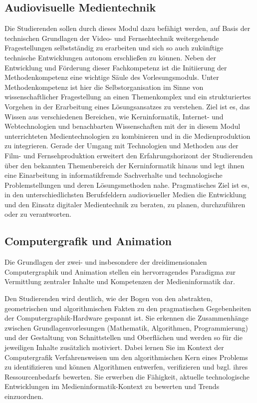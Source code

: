 \subsection{Audiovisuelle
Medientechnik}\label{audiovisuelle-medientechnik}

Die Studierenden sollen durch dieses Modul dazu befähigt werden, auf
Basis der technischen Grundlagen der Video- und Fernsehtechnik
weitergehende Fragestellungen selbstständig zu erarbeiten und sich so
auch zukünftige technische Entwicklungen autonom erschließen zu können.
Neben der Entwicklung und Förderung dieser Fachkompetenz ist die
Initiierung der Methodenkompetenz eine wichtige Säule des
Vorlesungsmoduls. Unter Methodenkompetenz ist hier die
Selbstorganisation im Sinne von wissenschaftlicher Fragestellung an
einen Themenkomplex und ein strukturiertes Vorgehen in der Erarbeitung
eines Lösungsansatzes zu verstehen. Ziel ist es, das Wissen aus
verschiedenen Bereichen, wie Kerninformatik, Internet- und
Webtechnologien und benachbarten Wissenschaften mit der in diesem Modul
unterrichteten Medientechnologien zu kombinieren und in die
Medienproduktion zu integrieren. Gerade der Umgang mit Technologien und
Methoden aus der Film- und Fernsehproduktion erweitert den
Erfahrungshorizont der Studierenden über den bekannten Themenbereich der
Kerninformatik hinaus und legt ihnen eine Einarbeitung in
informatikfremde Sachverhalte und technologische Problemstellungen und
deren Lösungsmethoden nahe. Pragmatisches Ziel ist es, in den
unterschiedlichsten Berufsfeldern audiovisueller Medien die Entwicklung
und den Einsatz digitaler Medientechnik zu beraten, zu planen,
durchzuführen oder zu verantworten.

\subsection{Computergrafik und
Animation}\label{computergrafik-und-animation}

Die Grundlagen der zwei- und insbesondere der dreidimensionalen
Computergraphik und Animation stellen ein hervorragendes Paradigma zur
Vermittlung zentraler Inhalte und Kompetenzen der Medieninformatik dar.

Den Studierenden wird deutlich, wie der Bogen von den abstrakten,
geometrischen und algorithmischen Fakten zu den pragmatischen
Gegebenheiten der Computergraphik-Hardware gespannt ist. Sie erkennen
die Zusammenhänge zwischen Grundlagenvorlesungen (Mathematik,
Algorithmen, Programmierung) und der Gestaltung von Schnittstellen und
Oberflächen und werden so für die jeweiligen Inhalte zusätzlich
motiviert. Dabei lernen Sie im Kontext der Computergrafik
Verfahrensweisen um den algorithmischen Kern eines Problems zu
identifizieren und können Algorithmen entwerfen, verifizieren und bzgl.
ihres Ressourcenbedarfs bewerten. Sie erwerben die Fähigkeit, aktuelle
technologische Entwicklungen im Medieninformatik-Kontext zu bewerten und
Trends einzuordnen.

